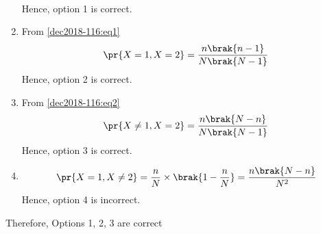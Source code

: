 \begin{enumerate}
\begin{align}
\end{align}
Hence, option 1 is correct.
\item From \eqref{dec2018-116:eq1}
\begin{align}
    \pr{X=1, X=2} = \frac{n \brak{n-1}}{N \brak{N-1}}
\end{align}
Hence, option 2 is correct.
\item From \eqref{dec2018-116:eq2}
\begin{align}
    \pr{X\neq1,X=2} = \frac{n \brak{N-n}}{N \brak{N-1}}
\end{align}
Hence, option 3 is correct.
\item 
\begin{align}
\pr{X=1, X\neq2} = \frac{n}{N} \times \brak{1-\frac{n}{N}} = \frac{n \brak{N-n}}{N^2}
\end{align}
Hence, option 4 is incorrect.
\end{enumerate}
Therefore, Options 1, 2, 3 are correct